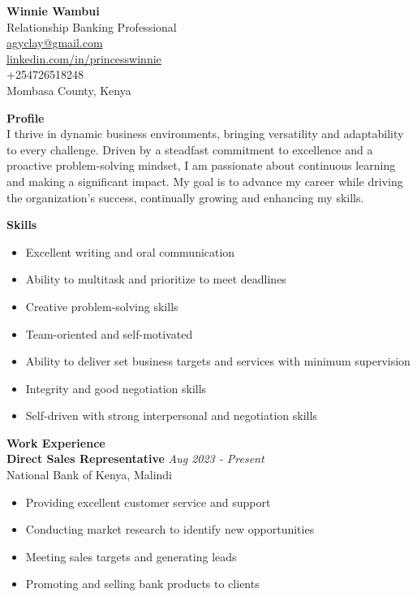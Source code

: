 \documentclass[a4paper,10pt]{article}
\begin{document}
\begin{center}
    \Huge \textbf{Winnie Wambui} \\
    \vspace{1mm}
    \normalsize Relationship Banking Professional \\
    \vspace{2mm}
    \href{mailto:agyclay@gmail.com}{agyclay@gmail.com} \\
    \href{https://www.linkedin.com/in/princesswinnie}{linkedin.com/in/princesswinnie} \\
    +254726518248 \\
    Mombasa County, Kenya \\
\end{center}

\vspace{4mm}

\noindent\textbf{\large Profile} \\
\noindent I thrive in dynamic business environments, bringing versatility and adaptability to every challenge. Driven by a steadfast commitment to excellence and a proactive problem-solving mindset, I am passionate about continuous learning and making a significant impact. My goal is to advance my career while driving the organization’s success, continually growing and enhancing my skills.

\vspace{4mm}

\noindent\textbf{\large Skills}
\begin{itemize}[leftmargin=*]
    \item Excellent writing and oral communication
    \item Ability to multitask and prioritize to meet deadlines
    \item Creative problem-solving skills
    \item Team-oriented and self-motivated
    \item Ability to deliver set business targets and services with minimum supervision
    \item Integrity and good negotiation skills
    \item Self-driven with strong interpersonal and negotiation skills
\end{itemize}

\vspace{4mm}

\noindent\textbf{\large Work Experience} \\
\textbf{Direct Sales Representative} \hfill \textit{Aug 2023 - Present} \\
National Bank of Kenya, Malindi \\
\begin{itemize}[leftmargin=*]
    \item Providing excellent customer service and support
    \item Conducting market research to identify new opportunities
    \item Meeting sales targets and generating leads
    \item Promoting and selling bank products to clients
\end{itemize}
\end{document}
